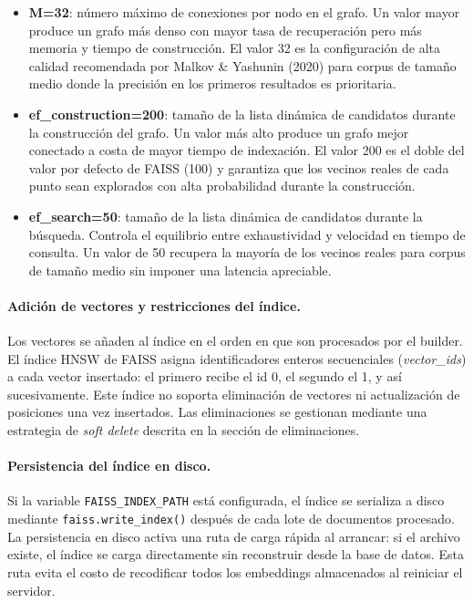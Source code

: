 \documentclass[11pt]{article}
\begin{document}
\begin{itemize}
\item \textbf{M=32}: número máximo de conexiones por nodo en el grafo. Un valor mayor produce
      un grafo más denso con mayor tasa de recuperación pero más memoria y tiempo de
      construcción. El valor 32 es la configuración de alta calidad recomendada por Malkov
      \& Yashunin (2020) para corpus de tamaño medio donde la precisión en los primeros
      resultados es prioritaria.

\item \textbf{ef\_construction=200}: tamaño de la lista dinámica de candidatos durante la
      construcción del grafo. Un valor más alto produce un grafo mejor conectado a costa de
      mayor tiempo de indexación. El valor 200 es el doble del valor por defecto de FAISS
      (100) y garantiza que los vecinos reales de cada punto sean explorados con alta
      probabilidad durante la construcción.

\item \textbf{ef\_search=50}: tamaño de la lista dinámica de candidatos durante la búsqueda.
      Controla el equilibrio entre exhaustividad y velocidad en tiempo de consulta. Un valor
      de 50 recupera la mayoría de los vecinos reales para corpus de tamaño medio sin imponer
      una latencia apreciable.
\end{itemize}

\paragraph{Adición de vectores y restricciones del índice.}
Los vectores se añaden al índice en el orden en que son procesados por el builder. El índice
HNSW de FAISS asigna identificadores enteros secuenciales (\emph{vector\_ids}) a cada vector
insertado: el primero recibe el id 0, el segundo el 1, y así sucesivamente. Este índice no
soporta eliminación de vectores ni actualización de posiciones una vez insertados. Las
eliminaciones se gestionan mediante una estrategia de \emph{soft delete} descrita en la
sección de eliminaciones.

\paragraph{Persistencia del índice en disco.}
Si la variable \texttt{FAISS\_INDEX\_PATH} está configurada, el índice se serializa a disco
mediante \texttt{faiss.write\_index()} después de cada lote de documentos procesado. La
persistencia en disco activa una ruta de carga rápida al arrancar: si el archivo existe, el
índice se carga directamente sin reconstruir desde la base de datos. Esta ruta evita el costo
de recodificar todos los embeddings almacenados al reiniciar el servidor.
\end{document}
